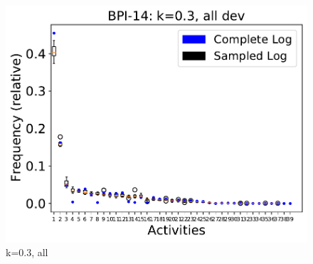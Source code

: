 \documentclass[landscape]{article}
\begin{document}
\begin{figure}[!htb]
	\begin{minipage}{0.2\textwidth}
		\includegraphics[width=1.0\textwidth]{../Detail_Incident_Activity/Detail_Incident_Activity_deviationsApprox_0.3_NONALIGNING_ALL.pdf}
		\caption{k=0.3, all}
	\end{minipage}
\end{figure}
\newpage
\end{document}
